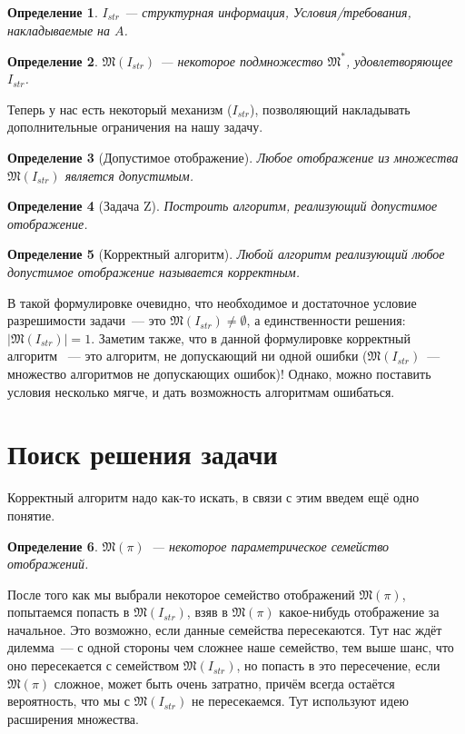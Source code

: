 \documentclass[a4paper, 12pt]{report}
\newtheorem*{definition}{Определение}
\begin{document}
\begin{definition} 
$I_{str}$ --- структурная информация, Условия/требования, накладываемые на $A$. 
\end{definition}

\begin{definition} 
$\mathfrak{M}(I_{str})$ --- некоторое подмножество $\mathfrak{M}^*$, удовлетворяющее $I_{str}$. 
\end{definition}

Теперь у нас есть некоторый механизм ($I_{str}$), позволяющий накладывать дополнительные ограничения на нашу задачу.

\begin{definition}[Допустимое отображение]
Любое отображение из множества $\mathfrak{M}(I_{str})$ является допустимым. 
\end{definition}

\begin{definition}[Задача Z] 
Построить алгоритм, реализующий допустимое отображение. \end{definition}

\begin{definition}[Корректный алгоритм] 
Любой алгоритм реализующий любое допустимое отображение называется корректным. 
\end{definition}

В такой формулировке очевидно, что необходимое и достаточное условие разрешимости задачи~--- это $\mathfrak{M}(I_{str})\neq\emptyset$, а единственности решения: $|\mathfrak{M}(I_{str})| = 1$. Заметим также, что в данной формулировке корректный алгоритм~ --- это алгоритм, не допускающий ни одной ошибки ($\mathfrak{M}(I_{str})$~--- множество алгоритмов не допускающих ошибок)! Однако, можно поставить условия несколько мягче, и дать возможность алгоритмам ошибаться.

\section{Поиск решения задачи}
Корректный алгоритм надо как-то искать, в связи с этим введем ещё одно понятие.

\begin{definition} 
$\mathfrak{M}(\pi)$~--- некоторое параметрическое семейство отображений. 
\end{definition}

После того как мы выбрали некоторое семейство отображений $\mathfrak{M}(\pi)$, попытаемся попасть в $\mathfrak{M}(I_{str})$, взяв в $\mathfrak{M}(\pi)$ какое-нибудь отображение за начальное. Это возможно, если данные семейства пересекаются. Тут нас ждёт дилемма~--- с одной стороны чем сложнее наше семейство, тем выше шанс, что оно пересекается с семейством $\mathfrak{M}(I_{str})$, но попасть в это пересечение, если $\mathfrak{M}(\pi)$ сложное, может быть очень затратно, причём всегда остаётся вероятность, что мы с $\mathfrak{M}(I_{str})$ не пересекаемся. Тут используют идею расширения множества.
\end{document}

